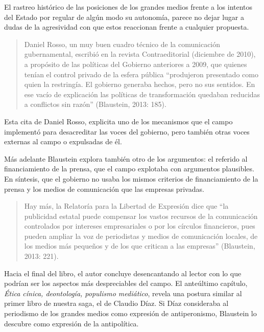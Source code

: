 El rastreo histórico de las posiciones de los grandes medios frente a los intentos del Estado por regular de algún modo su autonomía, parece no dejar lugar a dudas de la agresividad con que estos reaccionan frente a cualquier propuesta.

\begin{quote}
Daniel Rosso, un muy buen cuadro técnico de la comunicación gubernamental, escribió en la revista Contraeditorial (diciembre de 2010), a propósito de las políticas del Gobierno anteriores a 2009, que quienes tenían el control privado de la esfera pública \enquote{produjeron  presentado como quien la restringía. El gobierno generaba hechos, pero no sus sentidos. En ese vacío de explicación las políticas de transformación quedaban reducidas a conflictos sin razón} (Blaustein, 2013: 185).
\end{quote}

Esta cita de Daniel Rosso, explicita uno de los mecanismos que el campo implementó para desacreditar las voces del gobierno, pero también otras voces externas al campo o expulsadas de él.

Más adelante Blaustein explora también otro de los argumentos: el referido al financiamiento de la prensa, que el campo explotaba con argumentos plausibles. En síntesis, que el gobierno no usaba los mismos criterios de financiamiento de la prensa y los medios de comunicación que las empresas privadas.

\begin{quote}
Hay más, la Relatoría para la Libertad de Expresión dice que \enquote{la publicidad estatal puede compensar los vastos recursos de la comunicación controlados por intereses empresariales o por los círculos financieros, pues pueden ampliar la voz de periodistas y medios de comunicación locales, de los medios más pequeños y de los que critican a las empresas} (Blaustein, 2013: 221).
\end{quote}

Hacia el final del libro, el autor concluye desencantando al lector con lo que podrían ser los aspectos más despreciables del campo. El anteúltimo capítulo, \emph{Ética cínica, deontología, populismo mediático}, revela una postura similar al primer libro de nuestra saga, el de Claudio Díaz. Si Díaz consideraba al periodismo de los grandes medios como expresión de antiperonismo, Blaustein lo descubre como expresión de la antipolítica.

